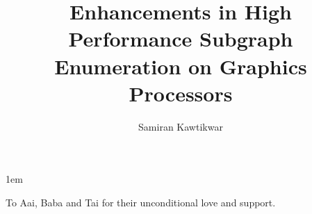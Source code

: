 \documentclass[draftthesis,tocnosub,noragright,centerchapter,12pt]{uiucecethesis09}
\title{Enhancements in High Performance Subgraph Enumeration on Graphics Processors}
\author{Samiran Kawtikwar}
\begin{document}
%

%
\maketitle

\parindent 1em%

\frontmatter

%
\begin{abstract}
    
\end{abstract}


%
\begin{dedication}
    To Aai, Baba and Tai for their unconditional love and support.
\end{dedication}

%
\begin{acknowledgments}
    
\end{acknowledgments}

%
\tableofcontents

%
\listoftables

%
\listoffigures

%
\end{document}
